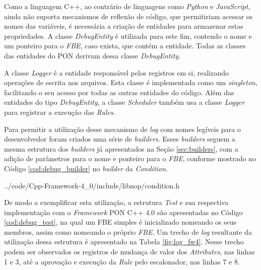 Como a linguagem C++, ao contrário de linguagens como \textit{Python} e
\textit{JavaScript}, ainda não suporta mecanismos de reflexão de código, que
permitiriam acessar os nomes das variáveis, é necessária a criação de entidades
para armazenar estas propriedades. A classe \textit{DebugEntity} é utilizada
para este fim, contendo o nome e um ponteiro para o \textit{FBE}, caso exista,
que contém a entidade. Todas as classes das entidades do PON derivam dessa
classe \textit{DebugEntity}.

\FloatBarrier

A classe \textit{Logger} é a entidade responsável pelos registros em si,
realizando operações de escrita nos arquivos. Esta classe é implementada como um
\textit{singleton}, facilitando o seu acesso por todas as outras entidades do
código. Além das entidades do tipo \textit{DebugEntity}, a classe
\textit{Scheduler} também usa a classe \textit{Logger} para registrar a execução
das \textit{Rules}.

Para permitir a utilização desse mecanismo de \textit{log} com nomes legíveis
para o desenvolvedor foram criados uma série de \textit{builders}. Esses
\textit{builders} seguem a mesma estrutura dos \textit{builders} já apresentados
na Seção \ref{sec:builders}, com a adição de parâmetros para o nome e ponteiro
para o \textit{FBE}, conforme mostrado no Código \ref{cod:debug_builder} no
\textit{builder} da \textit{Condition}.


            {../code/Cpp-Framework-4_0/include/libnop/condition.h}

De modo a exemplificar esta utilização, a estrutura \textit{Test} e sua
respectiva implementação com o \textit{Framework} PON C++ 4.0 são apresentadas
no Código \ref{cod:debug_test}, na qual um FBE simples é inicializado nomeando
os seus membros, assim como nomeando o próprio \textit{FBE}. Um trecho de
\textit{log} resultante da utilização dessa estrutura é apresentado na Tabela
\ref{fig:log_fw4}. Nesse trecho podem ser observados os registros de mudança de
valor dos \textit{Attributes}, nas linhas 1 e 3, até a aprovação e execução da
\textit{Rule} pelo escalonador, nas linhas 7 e 8.

